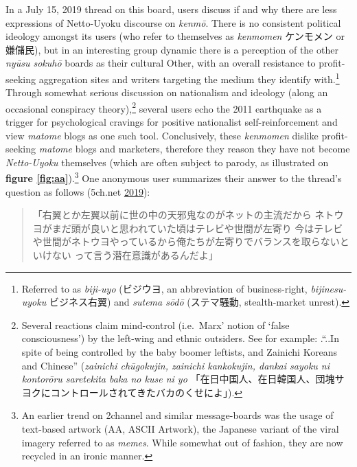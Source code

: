 \documentclass[10pt,british,A4paper,,openany]{memoir}
\begin{document}
In a July 15, 2019 thread on this board, users discuss if and why there
are less expressions of Netto-Uyoku discourse on \emph{kenmō}. There is
no consistent political ideology amongst its users (who refer to
themselves as \emph{kenmomen} ケンモメン or 嫌儲民), but in an
interesting group dynamic there is a perception of the other \emph{nyūsu
sokuhō} boards as their cultural Other, with an overall resistance to
profit-seeking aggregation sites and writers targeting the medium they
identify with.\footnote{Referred to as \emph{biji-uyo} (ビジウヨ, an
  abbreviation of business-right, \emph{bijinesu-uyoku} ビジネス右翼)
  and \emph{sutema sōdō} (ステマ騒動, stealth-market unrest).} Through
somewhat serious discussion on nationalism and ideology (along an
occasional conspiracy theory),\footnote{Several reactions claim
  mind-control (i.e.~Marx' notion of `false consciousness') by the
  left-wing and ethnic outsiders. See for example: .``..In spite of
  being controlled by the baby boomer leftists, and Zainichi Koreans and
  Chinese'' (\emph{zainichi chūgokujin, zainichi kankokujin, dankai
  sayoku ni kontorōru saretekita baka no kuse ni yo}
  「在日中国人、在日韓国人、団塊サヨクにコントロールされてきたバカのくせによ」).}
several users echo the 2011 earthquake as a trigger for psychological
cravings for positive nationalist self-reinforcement and view
\emph{matome} blogs as one such tool. Conclusively, these
\emph{kenmomen} dislike profit-seeking \emph{matome} blogs and
marketers, therefore they reason they have not become \emph{Netto-Uyoku}
themselves (which are often subject to parody, as illustrated on
\textbf{figure \ref{fig:aa}}).\footnote{An earlier trend on 2channel and
  similar message-boards was the usage of text-based artwork (AA, ASCII
  Artwork), the Japanese variant of the viral imagery referred to as
  \emph{memes}. While somewhat out of fashion, they are now recycled in
  an ironic manner.} One anonymous user summarizes their answer to the
thread's question as follows (5ch.net
\protect\hyperlink{ref-5ch.net_eng._2019}{2019}):

\begin{quote}
「右翼とか左翼以前に世の中の天邪鬼なのがネットの主流だから\newline
ネトウヨがまだ頭が良いと思われていた頃はテレビや世間が左寄り\newline
今はテレビや世間がネトウヨやっているから俺たちが左寄りでバランスを取らないといけない\newline
って言う潜在意識があるんだよ」
\end{quote}
\end{document}
